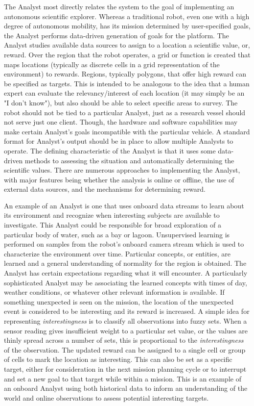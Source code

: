 \documentclass{tamuccthesis}
\begin{document}
The Analyst most directly relates the system to the goal of implementing an autonomous scientific explorer. Whereas a traditional robot, even one with a high degree of autonomous mobility, has its mission determined by user-specified goals, the Analyst performs data-driven generation of goals for the platform. The Analyst studies available data sources to assign to a location a scientific value, or, reward. Over the region that the robot operates, a grid or function is created that maps locations (typically as discrete cells in a grid representation of the environment) to rewards. Regions, typically polygons, that offer high reward can be specified as targets. This is intended to be analogous to the idea that a human expert can evaluate the relevancy/interest of each location (it may simply be an "I don't know"), but also should be able to select specific areas to survey. The robot should not be tied to a particular Analyst, just as a research vessel should not serve just one client. Though, the hardware and software capabilities may make certain Analyst's goals incompatible with the particular vehicle. A standard format for Analyst's output should be in place to allow multiple Analysts to operate. The defining characteristic of the Analyst is that it uses some data-driven methods to assessing the situation and automatically determining the scientific values. There are numerous approaches to implementing the Analyst, with major features being whether the analysis is online or offline, the use of external data sources, and the mechanisms for determining reward. 

An example of an Analyst is one that uses onboard data streams to learn about its environment and recognize when interesting subjects are available to investigate. This Analyst could be responsible for broad exploration of a particular body of water, such as a bay or lagoon. Unsupervised learning is performed on samples from the robot's onboard camera stream which is used to characterize the environment over time. Particular concepts, or entities, are learned and a general understanding of normality for the region is obtained. The Analyst has certain expectations regarding what it will encounter. A particularly sophisticated Analyst may be associating the learned concepts with times of day, weather conditions, or whatever other relevant information is available. If something unexpected is seen on the mission, the location of the unexpected event is considered to be interesting and its reward is increased. A simple idea for representing \textit{interestingness} is to classify all observations into fuzzy sets. When a sensor reading gives insufficient weight to a particular set value, or the values are thinly spread across a number of sets, this is proportional to the \textit{interestingness} of the observation. The updated reward can be assigned to a single cell or group of cells to mark the location as interesting. This can also be set as a specific target, either for consideration in the next mission planning cycle or to interrupt and set a new goal to that target while within a mission. This is an example of an onboard Analyst using both historical data to inform an understanding of the world and online observations to assess potential interesting targets. 
\end{document}
